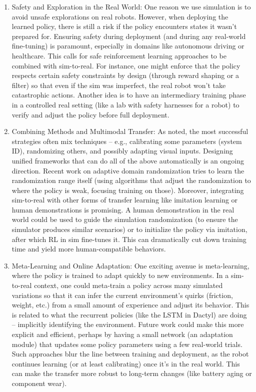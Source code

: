 \begin{enumerate}
    \item Safety and Exploration in the Real World: One reason we use simulation is to avoid unsafe explorations on real robots. However, when deploying the learned policy, there is still a risk if the policy encounters states it wasn’t prepared for. Ensuring safety during deployment (and during any real-world fine-tuning) is paramount, especially in domains like autonomous driving or healthcare. This calls for safe reinforcement learning approaches to be combined with sim-to-real. For instance, one might enforce that the policy respects certain safety constraints by design (through reward shaping or a filter) so that even if the sim was imperfect, the real robot won’t take catastrophic actions. Another idea is to have an intermediary training phase in a controlled real setting (like a lab with safety harnesses for a robot) to verify and adjust the policy before full deployment.
    \item Combining Methods and Multimodal Transfer: As noted, the most successful strategies often mix techniques – e.g., calibrating some parameters (system ID), randomizing others, and possibly adapting visual inputs. Designing unified frameworks that can do all of the above automatically is an ongoing direction. Recent work on adaptive domain randomization tries to learn the randomization range itself (using algorithms that adjust the randomization to where the policy is weak, focusing training on those). Moreover, integrating sim-to-real with other forms of transfer learning like imitation learning or human demonstrations is promising. A human demonstration in the real world could be used to guide the simulation randomization (to ensure the simulator produces similar scenarios) or to initialize the policy via imitation, after which RL in sim fine-tunes it. This can dramatically cut down training time and yield more human-compatible behaviors.
    \item Meta-Learning and Online Adaptation: One exciting avenue is meta-learning, where the policy is trained to adapt quickly to new environments. In a sim-to-real context, one could meta-train a policy across many simulated variations so that it can infer the current environment’s quirks (friction, weight, etc.) from a small amount of experience and adjust its behavior. This is related to what the recurrent policies (like the LSTM in Dactyl) are doing – implicitly identifying the environment. Future work could make this more explicit and efficient, perhaps by having a small network (an adaptation module) that updates some policy parameters using a few real-world trials. Such approaches blur the line between training and deployment, as the robot continues learning (or at least calibrating) once it’s in the real world. This can make the transfer more robust to long-term changes (like battery aging or component wear).

\end{enumerate}

